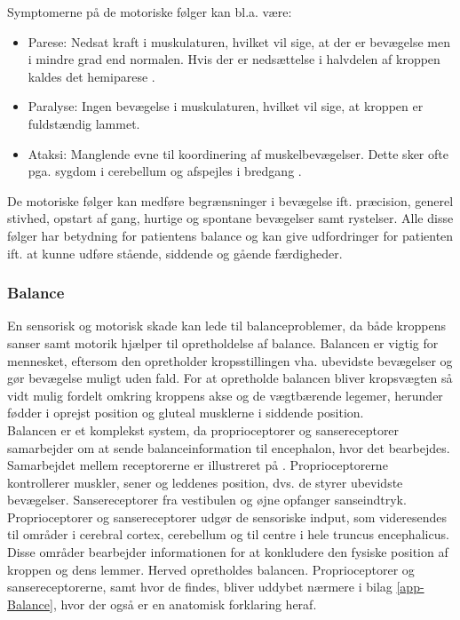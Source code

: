 \noindent Symptomerne på de motoriske følger kan bl.a. være:
\begin{itemize}
  \item Parese: Nedsat kraft i muskulaturen, hvilket vil sige, at der er bevægelse men i mindre grad end normalen. Hvis der er nedsættelse i halvdelen af kroppen kaldes det hemiparese \cite{Kruuse2015a}.
  \item Paralyse: Ingen bevægelse i muskulaturen, hvilket vil sige, at kroppen er fuldstændig lammet. \cite{Vistrup2015}
  \item Ataksi: Manglende evne til koordinering af muskelbevægelser. Dette sker ofte pga. sygdom i cerebellum og afspejles i bredgang \cite{Redaktionen2015a}. 
\end{itemize}
De motoriske følger kan medføre begrænsninger i bevægelse ift. præcision, generel stivhed, opstart af gang, hurtige og spontane bevægelser samt rystelser. Alle disse følger har betydning for patientens balance og kan give udfordringer for patienten ift. at kunne udføre stående, siddende og gående færdigheder. \cite{Kruuse2015a,DSfA2009} \\

\subsubsection{Balance}
En sensorisk og motorisk skade kan lede til balanceproblemer, da både kroppens sanser samt motorik hjælper til opretholdelse af balance. Balancen er vigtig for mennesket, eftersom den opretholder kropsstillingen vha. ubevidste bevægelser og gør bevægelse muligt uden fald. For at opretholde balancen bliver kropsvægten så vidt mulig fordelt omkring kroppens akse og de vægtbærende legemer, herunder fødder i oprejst position og gluteal musklerne i siddende position. \cite{Nichols1997} \\
Balancen er et komplekst system, da proprioceptorer og sansereceptorer samarbejder om at sende balanceinformation til encephalon, hvor det bearbejdes. Samarbejdet mellem receptorerne er illustreret på . Proprioceptorerne kontrollerer muskler, sener og leddenes position, dvs. de styrer ubevidste bevægelser. \cite{Martini2012} Sansereceptorer fra vestibulen og øjne opfanger sanseindtryk. Proprioceptorer og sansereceptorer udgør de sensoriske indput, som videresendes til områder i cerebral cortex, cerebellum og til centre i hele truncus encephalicus. Disse områder bearbejder informationen for at konkludere den fysiske position af kroppen og dens lemmer. Herved opretholdes balancen. \cite{Martini2012,Karnath2003} Proprioceptorer og sansereceptorerne, samt hvor de findes, bliver uddybet nærmere i bilag \ref{app-Balance}, hvor der også er en anatomisk forklaring heraf.

